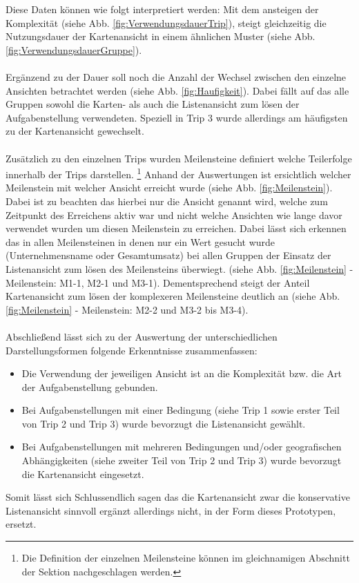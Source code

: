 \documentclass[Bachelorarbeit.tex]{subfiles}
\begin{document}
Diese Daten können wie folgt interpretiert werden: Mit dem ansteigen der Komplexität (siehe Abb. \ref{fig:VerwendungsdauerTrip}), steigt gleichzeitig die Nutzungsdauer der Kartenansicht in einem ähnlichen Muster (siehe Abb. \ref{fig:VerwendungsdauerGruppe}).\\
\\
Ergänzend zu der Dauer soll noch die Anzahl der Wechsel zwischen den einzelne Ansichten betrachtet werden (siehe Abb. \ref{fig:Haufigkeit}).
Dabei fällt auf das alle Gruppen sowohl die Karten- als auch die Listenansicht zum lösen der Aufgabenstellung verwendeten. 
Speziell in Trip 3 wurde allerdings am häufigsten zu der Kartenansicht gewechselt. \\
\\
Zusätzlich zu den einzelnen Trips wurden Meilensteine definiert welche Teilerfolge innerhalb der Trips darstellen.
\footnote{
	Die Definition der einzelnen Meilensteine können im gleichnamigen Abschnitt der Sektion  nachgeschlagen werden.
	}
Anhand der Auswertungen ist ersichtlich welcher Meilenstein mit welcher Ansicht erreicht wurde (siehe Abb. \ref{fig:Meilenstein}). 
Dabei ist zu beachten das hierbei nur die Ansicht genannt wird, welche zum Zeitpunkt des Erreichens aktiv war und nicht welche Ansichten wie lange davor verwendet wurden um diesen Meilenstein zu erreichen.
Dabei lässt sich erkennen das in allen Meilensteinen in denen nur ein Wert gesucht wurde (Unternehmensname oder Gesamtumsatz) bei allen Gruppen der Einsatz der Listenansicht zum lösen des Meilensteins überwiegt. (siehe Abb. \ref{fig:Meilenstein} - Meilenstein: M1-1, M2-1 und M3-1).
Dementsprechend steigt der Anteil Kartenansicht zum lösen der komplexeren Meilensteine deutlich an (siehe Abb. \ref{fig:Meilenstein} - Meilenstein:  M2-2 und M3-2 bis M3-4).  \\
\\
Abschließend lässt sich zu der Auswertung der unterschiedlichen Darstellungsformen folgende Erkenntnisse zusammenfassen: 
\begin{itemize}
	\item[] Die Verwendung der jeweiligen Ansicht ist an die Komplexität bzw. die Art der  Aufgabenstellung gebunden.
	\item[] Bei Aufgabenstellungen mit einer Bedingung (siehe Trip 1 sowie erster Teil von Trip 2 und Trip 3) wurde bevorzugt die Listenansicht gewählt.
	\item[] Bei Aufgabenstellungen mit mehreren Bedingungen und/oder geografischen Abhängigkeiten (siehe zweiter Teil von Trip 2 und Trip 3) wurde bevorzugt die Kartenansicht eingesetzt. 
\end{itemize}
Somit lässt sich Schlussendlich sagen das die Kartenansicht zwar die konservative Listenansicht sinnvoll ergänzt allerdings nicht, in der Form dieses Prototypen, ersetzt.
\end{document}
